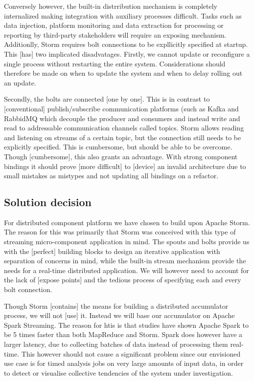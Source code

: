 Conversely however, the built-in distrribution mechanism is completely internalized making integration with auxiliary processes difficult. Tasks such as data injection, platform monitoring and data extraction for processing or reporting by third-party stakeholders will require an exposing mechanism. Additionlly, Storm requires bolt connections to be expllicitly specified at startup. This [has] two implicated disadvatages. Firstly, we cannot update or reconfigure a single process without restarting the entire system. Considerations should therefore be made on when to update the system and when to delay rolling out an update. 

Secondly, the bolts are connected [one by one]. This is in contrast to [conventional] publish/subscribe communication platforms (such as Kafka\cite{web:kafka} and RabbidMQ\cite{web:rabbidmq} which decouple the producer and consumers and instead write and read to addressable communication channels called topics. Storm allows reading and listening on streams of a certain topic, but the connection still needs to be explicitly specified. This is cumbersome, but should be able to be overcome. Though [cumbersome], this also grants an advantage. With strong component bindings it should prove [more difficult] to [device] an invalid architecture due to small mistakes as mistypes and not updating all bindings on a refactor. 

\subsection{Solution decision}
For distributed component platform we have chosen to build upon Apache Storm. The reason for this was primarily that Storm was conceived with this type of streaming micro-component application in mind. The spouts and bolts provide us with the [perfect] building blocks to design an iterative application with separation of concerns in mind, while the built-in stream mechanism provide the needs for a real-time distributed application. We will however need to account for the lack of [expose points] and the tedious process of specifying each and every bolt connection.

Though Storm [contains] the means for building a distributed accumulator process, we will not [use] it. Instead we will base our accumulator on Apache Spark Streaming. The reason for htis is that studies have shown Apache Spark to be 5 times faster than both MapReduce\cite{spark-vs-mapreduce} and Storm\cite{spark-vs-storm}. Spark does however have a larger latency, due to collecting batches of data instead of processing them real-time. This however should not cause a significant problem since our envisioned use case is for timed analysis jobs on very large amounts of input data, in order to detect or visualise collective tendencies of the system under investigation.

